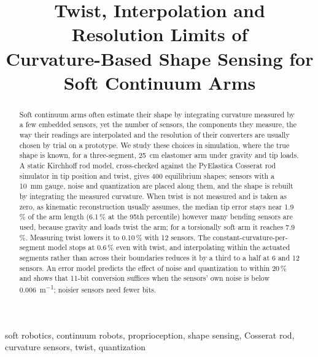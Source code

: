 \documentclass[conference]{IEEEtran}
\begin{document}
\title{Twist, Interpolation and Resolution Limits of\\
Curvature-Based Shape Sensing for Soft Continuum Arms}

\author{
}

\maketitle

\begin{abstract}
Soft continuum arms often estimate their shape by integrating curvature
measured by a few embedded sensors, yet the number of sensors, the
components they measure, the way their readings are interpolated and the
resolution of their converters are usually chosen by trial on a prototype.
We study these choices in simulation, where the true shape is known, for a
three-segment, \SI{25}{cm} elastomer arm under gravity and tip loads. A
static Kirchhoff rod model, cross-checked against the PyElastica Cosserat rod
simulator in tip position and twist, gives 400 equilibrium shapes; sensors
with a \SI{10}{mm} gauge, noise and quantization are placed along them, and
the shape is rebuilt by integrating the measured curvature. When twist is
not measured and is taken as zero, as kinematic reconstruction usually
assumes, the median tip error stays near 1.9\,\% of the arm length
(6.1\,\% at the 95th percentile) however many bending sensors are used,
because gravity and loads twist the arm; for a torsionally soft arm it
reaches 7.9\,\%. Measuring twist lowers it to 0.10\,\% with 12 sensors. The
constant-curvature-per-segment model stops at 0.6\,\% even with twist, and
interpolating within the actuated segments rather than across their
boundaries reduces it by a third to a half at 6 and 12 sensors. An error
model predicts the effect of noise and quantization to within 20\,\% and
shows that 11-bit conversion suffices when the sensors' own noise is below
\SI{0.006}{m^{-1}}; noisier sensors need fewer bits.
\end{abstract}

\begin{IEEEkeywords}
soft robotics, continuum robots, proprioception, shape sensing, Cosserat rod,
curvature sensors, twist, quantization
\end{IEEEkeywords}
\end{document}
